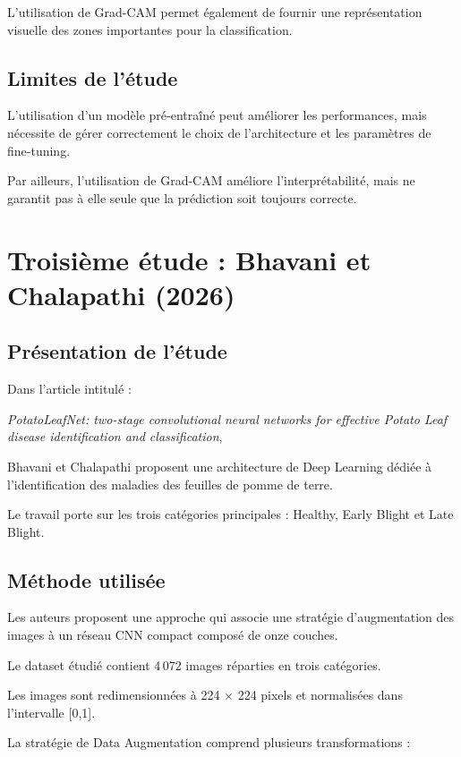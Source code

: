 \documentclass[12pt,a4paper,oneside]{report}
\begin{document}
L'utilisation de Grad-CAM permet également de fournir
une représentation visuelle des zones importantes
pour la classification.

\subsection{Limites de l'étude}

L'utilisation d'un modèle pré-entraîné peut améliorer
les performances, mais nécessite de gérer correctement
le choix de l'architecture et les paramètres de
fine-tuning.

Par ailleurs, l'utilisation de Grad-CAM améliore
l'interprétabilité, mais ne garantit pas à elle seule
que la prédiction soit toujours correcte.

\section{Troisième étude : Bhavani et Chalapathi (2026)}

\subsection{Présentation de l'étude}

Dans l'article intitulé :

\textit{PotatoLeafNet: two-stage convolutional neural
networks for effective Potato Leaf disease identification
and classification},

Bhavani et Chalapathi proposent une architecture de
Deep Learning dédiée à l'identification des maladies
des feuilles de pomme de terre.

Le travail porte sur les trois catégories principales :
Healthy, Early Blight et Late Blight.

\subsection{Méthode utilisée}

Les auteurs proposent une approche qui associe une
stratégie d'augmentation des images à un réseau CNN
compact composé de onze couches.

Le dataset étudié contient 4\,072 images réparties
en trois catégories.

Les images sont redimensionnées à 224 $\times$ 224 pixels
et normalisées dans l'intervalle [0,1].

La stratégie de Data Augmentation comprend plusieurs
transformations :
\end{document}

